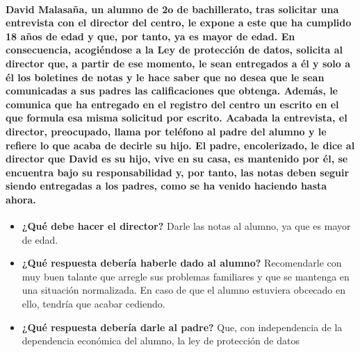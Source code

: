 \paragraph{David Malasaña, un alumno de 2o de bachillerato, tras solicitar una entrevista con el
director del centro, le expone a este que ha cumplido 18 años de edad y que, por
tanto, ya es mayor de edad. En consecuencia, acogiéndose a la Ley de protección de
datos, solicita al director que, a partir de ese momento, le sean entregados a él y solo
a él los boletines de notas y le hace saber que no desea que le sean comunicadas a sus
padres las calificaciones que obtenga. Además, le comunica que ha entregado en el
registro del centro un escrito en el que formula esa misma solicitud por escrito.
Acabada la entrevista, el director, preocupado, llama por teléfono al padre del alumno
y le refiere lo que acaba de decirle su hijo. El padre, encolerizado, le dice al director
que David es su hijo, vive en su casa, es mantenido por él, se encuentra bajo su
responsabilidad y, por tanto, las notas deben seguir siendo entregadas a los padres,
como se ha venido haciendo hasta ahora.}

\begin{itemize}
\item \textbf{¿Qué debe hacer el director?}
\subitem Darle las notas al alumno, ya que es mayor de edad.
\item \textbf{¿Qué respuesta debería haberle dado al alumno?}
\subitem Recomendarle con muy buen talante que arregle sus problemas familiares y que se mantenga en una situación normalizada.
%
En caso de que el alumno estuviera obcecado en ello, tendría que acabar cediendo.
\item \textbf{¿Qué respuesta debería darle al padre?}
\subitem Que, con independencia de la dependencia económica del alumno, la ley de protección de datos
\end{itemize}


